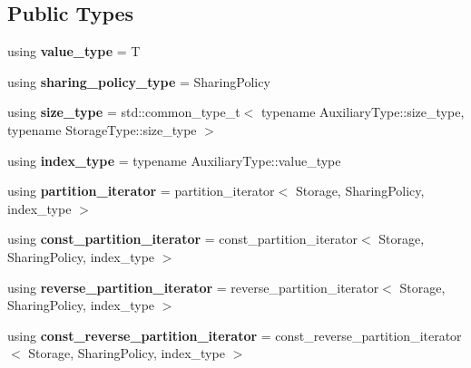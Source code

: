 \subsection*{Public Types}
\begin{DoxyCompactItemize}
\item 
\mbox{\label{classsequoia_1_1data__structures_1_1contiguous__storage__base_a2ef6fb4b75c940420b54ca96a1c83bda}} 
using {\bfseries value\+\_\+type} = T
\item 
\mbox{\label{classsequoia_1_1data__structures_1_1contiguous__storage__base_a7c0310cb75e59ab226fc6b09b6d443f8}} 
using {\bfseries sharing\+\_\+policy\+\_\+type} = Sharing\+Policy
\item 
\mbox{\label{classsequoia_1_1data__structures_1_1contiguous__storage__base_a8fae3d0410e62ade901c62d9d4b3e637}} 
using {\bfseries size\+\_\+type} = std\+::common\+\_\+type\+\_\+t$<$ typename Auxiliary\+Type\+::size\+\_\+type, typename Storage\+Type\+::size\+\_\+type $>$
\item 
\mbox{\label{classsequoia_1_1data__structures_1_1contiguous__storage__base_a79bb572f6246691f31be5045766ce7aa}} 
using {\bfseries index\+\_\+type} = typename Auxiliary\+Type\+::value\+\_\+type
\item 
\mbox{\label{classsequoia_1_1data__structures_1_1contiguous__storage__base_a7bcbf35d172b0448cdb22bf258e5d413}} 
using {\bfseries partition\+\_\+iterator} = partition\+\_\+iterator$<$ Storage, Sharing\+Policy, index\+\_\+type $>$
\item 
\mbox{\label{classsequoia_1_1data__structures_1_1contiguous__storage__base_ad39031528b4c717d4234f2540d708a28}} 
using {\bfseries const\+\_\+partition\+\_\+iterator} = const\+\_\+partition\+\_\+iterator$<$ Storage, Sharing\+Policy, index\+\_\+type $>$
\item 
\mbox{\label{classsequoia_1_1data__structures_1_1contiguous__storage__base_a816a58514f91b8861a8371d38fb9b5e4}} 
using {\bfseries reverse\+\_\+partition\+\_\+iterator} = reverse\+\_\+partition\+\_\+iterator$<$ Storage, Sharing\+Policy, index\+\_\+type $>$
\item 
\mbox{\label{classsequoia_1_1data__structures_1_1contiguous__storage__base_aa316696f70c209959ff41e5f63cf9482}} 
using {\bfseries const\+\_\+reverse\+\_\+partition\+\_\+iterator} = const\+\_\+reverse\+\_\+partition\+\_\+iterator$<$ Storage, Sharing\+Policy, index\+\_\+type $>$
\end{DoxyCompactItemize}
